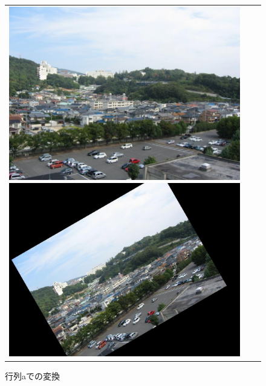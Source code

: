 \documentclass[a4j]{jarticle}
\begin{document}
\begin{figure}[htbp]
\begin{tabular}{ccc}
\begin{minipage}{0.4\hsize}
\center
\includegraphics[bb=0 0 768 576,scale=.2]{0.jpg}
\caption{変換前の元画像}
\end{minipage}
\begin{minipage}{0.3\hsize}
\center
\includegraphics[bb=0 0 1024 768,scale=.13]{outa.jpg}
\caption{行列aでの変換}
\end{minipage}
\begin{minipage}{0.3\hsize}
\center

\end{minipage}
\end{tabular}
\end{figure}
\end{document}
